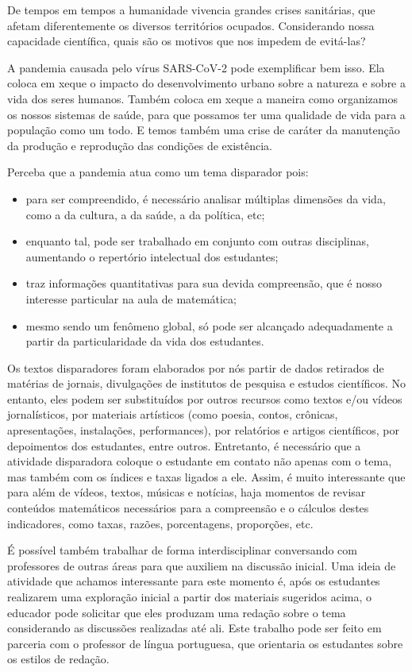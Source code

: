 \begin{paginatexto}
De tempos em tempos a humanidade vivencia grandes crises sanitárias, que afetam diferentemente os diversos territórios ocupados. Considerando nossa capacidade científica, quais são os motivos que nos impedem de evitá-las?

A pandemia causada pelo vírus SARS-CoV-2 pode exemplificar bem isso. Ela coloca em xeque o impacto do desenvolvimento urbano sobre a natureza e sobre a vida dos seres humanos. Também coloca em xeque a maneira como organizamos os nossos sistemas de saúde, para que possamos ter uma qualidade de vida para a população como um todo. E temos também uma crise de caráter da manutenção da produção e reprodução das condições de existência.

Perceba que a pandemia atua como um tema disparador pois:

\begin{itemize}
\item para ser compreendido, é necessário analisar múltiplas dimensões da vida, como a da cultura, a da saúde, a da política, etc;
\item enquanto tal, pode ser trabalhado em conjunto com outras disciplinas, aumentando o repertório intelectual dos estudantes;
\item traz informações quantitativas para sua devida compreensão, que é nosso interesse particular na aula de matemática;
\item mesmo sendo um fenômeno global, só pode ser alcançado adequadamente a partir da particularidade da vida dos estudantes.
\end{itemize}

Os textos disparadores foram elaborados por nós partir de dados retirados de matérias de jornais, divulgações de institutos de pesquisa e estudos científicos. No entanto, eles podem ser substituídos por outros recursos como textos e/ou vídeos jornalísticos, por materiais artísticos (como poesia, contos, crônicas, apresentações, instalações, performances), por relatórios e artigos científicos, por depoimentos dos estudantes, entre outros. Entretanto, é necessário que a atividade disparadora coloque o estudante em contato não apenas com o tema, mas também com os índices e taxas ligados a ele. Assim, é muito interessante que para além de vídeos, textos, músicas e notícias, haja momentos de revisar conteúdos matemáticos necessários para a compreensão e o cálculos destes indicadores, como taxas, razões, porcentagens, proporções, etc. 

É possível também trabalhar de forma interdisciplinar conversando com professores de outras áreas para que auxiliem na discussão inicial. Uma ideia de atividade que achamos interessante para este momento é, após os estudantes realizarem uma exploração inicial a partir dos materiais sugeridos acima, o educador pode solicitar que eles produzam uma redação sobre o tema considerando as discussões realizadas até ali. Este trabalho pode ser feito em parceria com o professor de língua portuguesa, que orientaria os estudantes sobre os estilos de redação.


\end{paginatexto}

